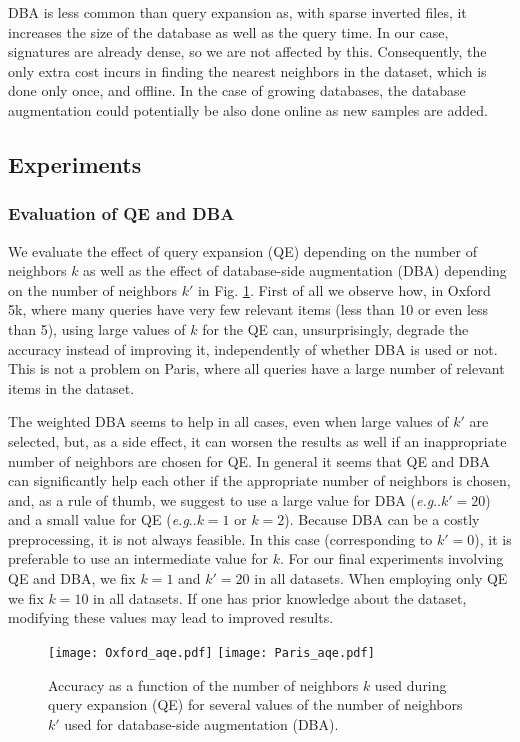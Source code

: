 \documentclass[twocolumn]{svjour3}          \smartqed  \usepackage{graphicx}
\makeatletter
\DeclareRobustCommand\onedot{\futurelet\@let@token\@onedot}
\def\@onedot{\ifx\@let@token.\else.\null\fi\xspace}
\def\eg{\emph{e.g}\onedot} \def\Eg{\emph{E.g}\onedot}
\makeatother
\begin{document}
DBA is less common than query expansion as, with sparse inverted files, it increases the size of the database as well as the query time. In our case, signatures are already dense, so we are not affected by this. Consequently, the only extra cost incurs in finding the nearest neighbors in the dataset, which is done only once, and offline.
In the case of growing databases, the database augmentation could potentially be also done online as new samples are added.

\subsection{Experiments}
\label{sub:part3xps}

\subsubsection{Evaluation of QE and DBA}
We evaluate the effect of query expansion (QE) depending on the number of neighbors $k$ as well as the effect of database-side augmentation (DBA) depending on the number of neighbors $k'$ in Fig. \ref{fig:aqe}.
First of all we observe how, in Oxford 5k, where many queries have very few relevant items (less than 10 or even less than 5), using large values of $k$ for the QE can, unsurprisingly, degrade the accuracy instead of improving it, independently of whether DBA is used or not. This is not a problem on Paris, where all queries have a large number of relevant items in the dataset. 

The weighted DBA seems to help in all cases, even when large values of $k'$ are selected, but, as a side effect, it can worsen the results as well if an inappropriate number of neighbors are chosen for QE.
In general it seems that QE and DBA can significantly help each other if the appropriate number of neighbors is chosen, and, as a rule of thumb, we suggest to use a large value for DBA (\eg $k'=20$) and a small value for QE (\eg $k=1$ or $k=2$). 
Because DBA can be a costly preprocessing, it is not always feasible. In this case (corresponding to $k'=0$), it is preferable to use an intermediate value for $k$.
For our final experiments involving QE and DBA, we fix $k=1$ and $k'=20$ in all datasets. When employing only QE we fix $k=10$ in all datasets. If one has prior knowledge about the dataset, modifying these values may lead to improved results.


\begin{figure}[t!]
 \begin{centering}
\texttt{[image: Oxford\_aqe.pdf]}
\texttt{[image: Paris\_aqe.pdf]}
 \par\end{centering}
 \caption{\label{fig:aqe} Accuracy as a function of the number of neighbors $k$ used during query expansion (QE) for several values of the number of neighbors $k'$ used for database-side augmentation (DBA).}
 \end{figure}
\end{document}
